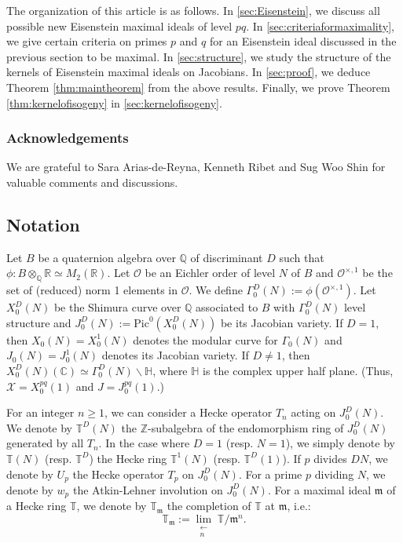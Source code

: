 \documentclass[a4paper, 12pt]{amsart}
\theoremstyle{definition}
\theoremstyle{remark}
\numberwithin{equation}{section} \numberwithin{table}{section}
\begin{document}
The organization of this article is as follows. In \textsection \ref{sec:Eisenstein}, we discuss all possible new Eisenstein maximal ideals of level $pq$. In \textsection \ref{sec:criteriaformaximality}, we give certain criteria on primes $p$ and $q$ for an Eisenstein ideal discussed in the previous section to be maximal. In \textsection \ref{sec:structure}, we study the structure of the kernels of Eisenstein maximal ideals on Jacobians. In \textsection \ref{sec:proof}, we deduce Theorem \ref{thm:maintheorem} from the above results. Finally, we prove Theorem \ref{thm:kernelofisogeny} in \textsection \ref{sec:kernelofisogeny}. 

\subsubsection*{Acknowledgements} We are grateful to Sara Arias-de-Reyna, Kenneth Ribet and Sug Woo Shin for valuable comments and discussions.

\subsection{Notation}
Let $B$ be a quaternion algebra over ${{\mathbb{Q}}}$ of discriminant $D$ such that $\phi : B\otimes_{{\mathbb{Q}}} {{\mathbb{R}}} \simeq M_2({{\mathbb{R}}})$. Let ${{\mathcal{O}}}$ be an Eichler order of level $N$ of $B$ and ${{\mathcal{O}}}^{\times, 1}$ be the set of (reduced) norm 1 elements in ${{\mathcal{O}}}$. We define $\Gamma_0^D(N):=\phi({{\mathcal{O}}}^{\times, 1})$. Let $X_0^D(N)$ be the Shimura curve over ${{\mathbb{Q}}}$ associated to $B$ with $\Gamma_0^D(N)$ level structure and $J_0^D(N):={{\mathrm{Pic}}}^0(X_0^D(N))$ be its Jacobian variety. If $D=1$, then $X_0(N)=X_0^1(N)$ denotes the modular curve for $\Gamma_0(N)$ and $J_0(N)=J_0^1(N)$ denotes its Jacobian variety. If $D\neq 1$, then $X_0^D(N)({{\mathbb{C}}}) \simeq \Gamma_0^D(N)\backslash {{\mathbb{H}}}$, where ${{\mathbb{H}}}$ is the complex upper half plane. (Thus, ${{\mathcal{X}}}=X_0^{pq}(1)$ and $J=J_0^{pq}(1)$.)

For an integer $n\geq 1$, we can consider a Hecke operator $T_n$ acting on $J_0^D(N)$. We denote by ${{\mathbb{T}}}^D(N)$ the ${{\mathbb{Z}}}$-subalgebra of the endomorphism ring of $J_0^D(N)$ generated by
all $T_n$. In the case where $D=1$ (resp. $N=1$), we simply denote by ${{\mathbb{T}}}(N)$ (resp. ${{\mathbb{T}}}^D$) the Hecke ring ${{\mathbb{T}}}^1(N)$ (resp. ${{\mathbb{T}}}^D(1)$). 
If $p$ divides $DN$, we denote by $U_p$ the Hecke operator $T_p$ on $J_0^D(N)$. 
For a prime $p$ dividing $N$, we denote by $w_p$ the Atkin-Lehner involution on $J_0^D(N)$. 
For a maximal ideal ${{\mathfrak{m}}}$ of a Hecke ring ${{\mathbb{T}}}$, we denote by ${{\mathbb{T}}}_{{\mathfrak{m}}}$ the completion of ${{\mathbb{T}}}$ at ${{\mathfrak{m}}}$, i.e.: 
$$
{{\mathbb{T}}}_{{\mathfrak{m}}}:= {\lim_{\substack{\longleftarrow\\{n}}}\;} {{\mathbb{T}}}/{{{\mathfrak{m}}}^n}.
$$
\end{document}
